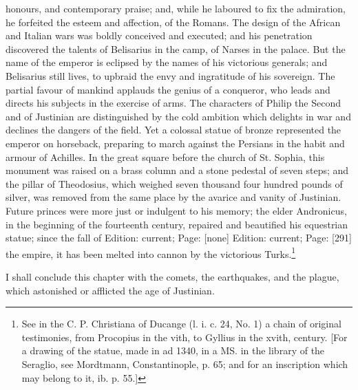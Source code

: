 honours, and contemporary praise; and, while he laboured to fix the admiration, he forfeited the esteem and affection, of the Romans. The design of the African and Italian wars was boldly conceived and executed; and his penetration discovered the talents of Belisarius in the camp, of Narses in the palace. But the name of the emperor is eclipsed by the names of his victorious generals; and Belisarius still lives, to upbraid the envy and ingratitude of his sovereign. The partial favour of mankind applauds the genius of a conqueror, who leads and directs his subjects in the exercise of arms. The characters of Philip the Second and of Justinian are distinguished by the cold ambition which delights in war and declines the dangers of the field. Yet a colossal statue of bronze represented the emperor on horseback, preparing to march against the Persians in the habit and armour of Achilles. In the great square before the church of St. Sophia, this monument was raised on a brass column and a stone pedestal of seven steps; and the pillar of Theodosius, which weighed seven thousand four hundred pounds of silver, was removed from the same place by the avarice and vanity of Justinian. Future princes were more just or indulgent to his memory; the elder Andronicus, in the beginning of the fourteenth century, repaired and beautified his equestrian statue; since the fall of Edition: current; Page: [none] Edition: current; Page: [291] the empire, it has been melted into cannon by the victorious Turks.\footnote{See in the C. P. Christiana of Ducange (l. i. c. 24, No. 1) a chain of original testimonies, from Procopius in the vith, to Gyllius in the xvith, century. [For a drawing of the statue, made in ad 1340, in a MS. in the library of the Seraglio, see Mordtmann, Constantinople, p. 65; and for an inscription which may belong to it, ib. p. 55.]}

I shall conclude this chapter with the comets, the earthquakes, and the plague, which astonished or afflicted the age of Justinian.

